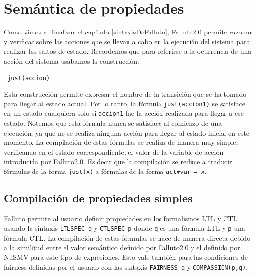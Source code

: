 \documentclass[pdftex,a4paper,12pt]{book}
\begin{document}
\section{Sem\'antica de propiedades}
Como vimos al finalizar el cap\'itulo \ref{sintaxisDeFalluto}, Falluto2.0 permite razonar y verificar sobre las acciones que se llevan a cabo en la ejecuci\'on del sistema para realizar los saltos de estado. Recordemos que para referirse a la ocurrencia de una acci\'on del sistema us\'abamos la construcci\'on:
\begin{center}\texttt{ just(accion)}\end{center}
Esta construcci\'on permite expresar el nombre de la transici\'on que se ha tomado para llegar al estado actual. Por lo tanto, la f\'ormula \texttt{just(accion1)} se satisface en un estado cualquiera solo si \texttt{accion1} fue la acci\'on realizada para llegar a ese estado. Notemos que esta f\'ormula nunca se satisface al comienzo de una ejecuci\'on, ya que no se realiza ninguna acci\'on para llegar al estado inicial en este momento. La compilaci\'on de estas f\'ormulas se realiza de manera muy simple, verificando en el estado correspondiente, el valor de la variable de acci\'on introducida por Falluto2.0. Es decir que la compilaci\'on se reduce a traducir f\'ormulas de la forma \texttt{just(x)} a f\'ormulas de la forma \texttt{act\#var = x}.
\subsection*{Compilaci\'on de propiedades simples}
Falluto permite al usuario definir propiedades en los formalismos LTL y CTL usando la sintaxis \texttt{LTLSPEC~q} y \texttt{CTLSPEC~p} donde \texttt{q} es una f\'ormula LTL y \texttt{p} una f\'ormula CTL. La compilaci\'on de estas f\'ormulas se hace de manera directa debido a la similitud entre el valor sem\'antico definido por Falluto2.0 y el definido por NuSMV para este tipo de expresiones. Esto vale tambi\'en para las condiciones de fairness definidas por el usuario con las sintaxis \texttt{FAIRNESS~q} y \texttt{COMPASSION(p,q)}.
\end{document}
